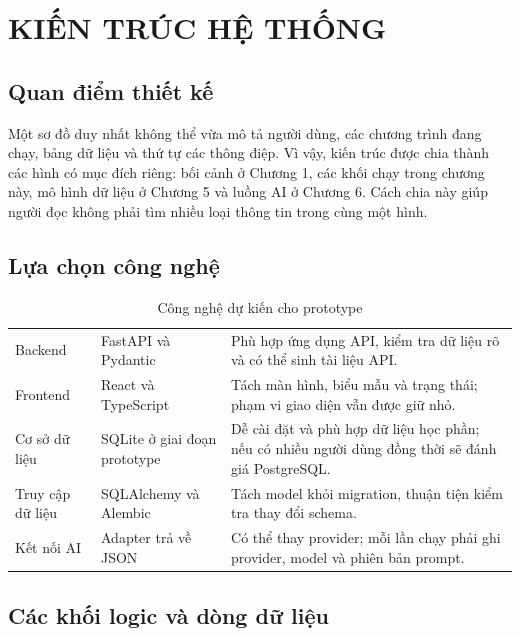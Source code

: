 \chapter{KIẾN TRÚC HỆ THỐNG}

\section{Quan điểm thiết kế}

Một sơ đồ duy nhất không thể vừa mô tả người dùng, các chương trình đang chạy, bảng dữ liệu và thứ tự các thông điệp. Vì vậy, kiến trúc được chia thành các hình có mục đích riêng: bối cảnh ở Chương 1, các khối chạy trong chương này, mô hình dữ liệu ở Chương 5 và luồng AI ở Chương 6. Cách chia này giúp người đọc không phải tìm nhiều loại thông tin trong cùng một hình.

\section{Lựa chọn công nghệ}

\begin{table}[h!]
\centering
\small
\caption{Công nghệ dự kiến cho prototype}
\label{tab:v8-tech}
\begin{tabularx}{\textwidth}{|L{3.0cm}|L{3.5cm}|Y|}
\hline
{} &  & \\
\hline
Backend & FastAPI và Pydantic & Phù hợp ứng dụng API, kiểm tra dữ liệu rõ và có thể sinh tài liệu API.\\
\hline
Frontend & React và TypeScript & Tách màn hình, biểu mẫu và trạng thái; phạm vi giao diện vẫn được giữ nhỏ.\\
\hline
Cơ sở dữ liệu & SQLite ở giai đoạn prototype & Dễ cài đặt và phù hợp dữ liệu học phần; nếu có nhiều người dùng đồng thời sẽ đánh giá PostgreSQL.\\
\hline
Truy cập dữ liệu & SQLAlchemy và Alembic & Tách model khỏi migration, thuận tiện kiểm tra thay đổi schema.\\
\hline
Kết nối AI & Adapter trả về JSON & Có thể thay provider; mỗi lần chạy phải ghi provider, model và phiên bản prompt.\\
\hline
\end{tabularx}
\end{table}

\section{Các khối logic và dòng dữ liệu}

